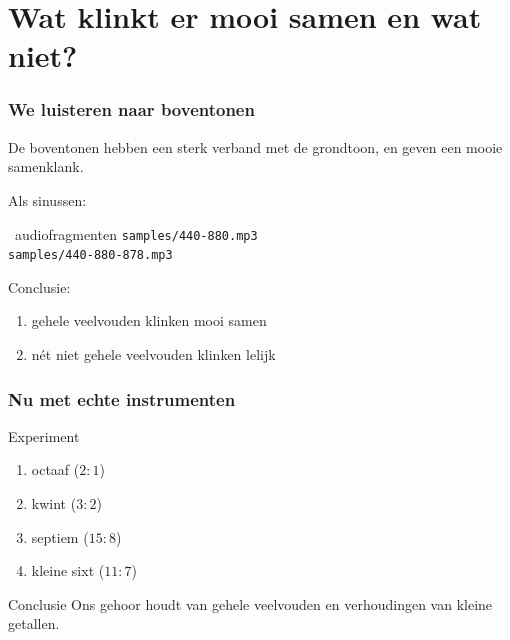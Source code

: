 \documentclass[compress, darktitle, framenumber, totalframenumber, handout]{beamer}
\begin{document}
\section{Wat klinkt er mooi samen en wat niet?}

\begin{frame}
  \frametitle{We luisteren naar boventonen}

  De boventonen hebben een sterk verband met de grondtoon, en geven een mooie samenklank.

  \pause

  Als sinussen:
  \begin{block}{\twonotes\ audiofragmenten}
    \texttt{samples/440-880.mp3} \\
    \texttt{samples/440-880-878.mp3} \\
  \end{block}

  \pause
  Conclusie:
  \begin{enumerate}
    \item gehele veelvouden klinken mooi samen
    \item n\'et niet gehele veelvouden klinken lelijk
  \end{enumerate}
\end{frame}

\begin{frame}
  \frametitle{Nu met echte instrumenten}

  \begin{block}{Experiment}
    \begin{enumerate}
      \item octaaf ($2:1$)
        \pause
      \item kwint ($3:2$)
        \pause
      \item septiem ($15:8$)
        \pause
      \item kleine sixt ($11:7$)
    \end{enumerate}
  \end{block}

  \pause

  \begin{alertblock}{Conclusie}
    Ons gehoor houdt van gehele veelvouden en verhoudingen van kleine getallen.
  \end{alertblock}
\end{frame}
\end{document}
